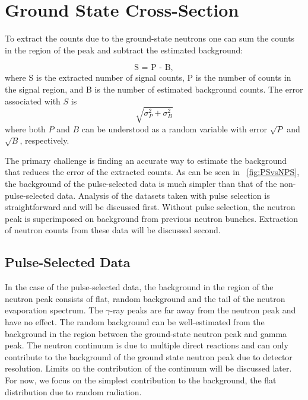 \section{Ground State Cross-Section}

To extract the counts due to the ground-state neutrons one can sum the counts in the region of the peak and subtract the estimated background:

\begin{equation}
\text{S = P - B},
\label{eq:counts}
\end{equation}
where S is the extracted number of signal counts, P is the number of counts in the signal region, and B is the number of estimated background counts.  The error associated with $S$ is
\begin{equation}
\sqrt{\sigma_{P}^2 + \sigma_{B}^2}
\label{eq:errDef}
\end{equation}
where both $P$ and $B$ can be understood as a random variable with error $\sqrt{P}$ and $\sqrt{B}$, respectively.

The primary challenge is finding an accurate way to estimate the background that reduces the error of the extracted counts.  As can be seen in {\fig}~\ref{fig:PSvsNPS}, the background of the pulse-selected data is much simpler than that of the non-pulse-selected data.  Analysis of the datasets taken with pulse selection is straightforward and will be discussed first.  Without pulse selection, the neutron peak is superimposed on background from previous neutron bunches.  Extraction of neutron counts from these data will be discussed second.

\subsection{Pulse-Selected Data}
In the case of the pulse-selected data, the background in the region of the neutron peak consists of flat, random background and the tail of the neutron evaporation spectrum.  The $\gamma$-ray peaks are far away from the neutron peak and have no effect.  The random background can be well-estimated from the background in the region between the ground-state neutron peak and gamma peak.  The neutron continuum is due to multiple direct reactions and can only contribute to the background of the ground state neutron peak due to detector resolution.  Limits on the contribution of the continuum will be discussed later.  For now, we focus on the simplest contribution to the background, the flat distribution due to random radiation.

